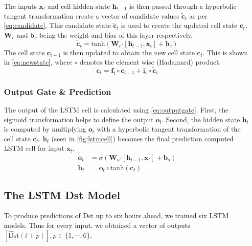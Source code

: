 The inputs $\mathbf{x}_t$ and cell hidden state $\mathbf{h}_{t-1}$ is then passed through a hyperbolic tangent 
transformation create a vector of candidate values $\tilde{\mathbf{c}}_{t}$ as per \cref{eq:candidate}. 
This candidate state $\tilde{\mathbf{c}}_{t}$ is used to create the updated cell state $\mathbf{c}_{t}$. 
$\mathbf{W}_{c}$  and  $\mathbf{b}_{c}$ being the weight and bias of this layer respectively.
%
\begin{equation}\label{eq:candidate}
 \tilde{\mathbf{c}}_{t} = \text{tanh} \left( \mathbf{W}_{c} \boldsymbol{\cdot}  \left[ \mathbf{h}_{t-1},\mathbf{x}_t \right] + 
 \mathbf{b}_{c} \right)
\end{equation}
%
The cell state  $\mathbf{c}_{t-1}$ is then updated to obtain the new cell state $\mathbf{c}_t$. This 
is shown in \cref{eq:newstate}, where $\circ$ denotes the element wise (Hadamard) product. 
%
\begin{equation}\label{eq:newstate}
 \mathbf{c}_t = \mathbf{f}_{t} \circ \mathbf{c}_{t-1} + \mathbf{i}_{t} \circ \tilde{\mathbf{c}}_{t}
\end{equation}

\subsubsection*{Output Gate \& Prediction}

The output of the LSTM cell is calculated using \cref{eq:outputgate}. First, the 
sigmoid transformation helps to define the output $\mathbf{o}_t$. Second, the hidden state $\mathbf{h}_t$ 
is computed by multiplying $\mathbf{o}_{t}$ with a hyperbolic tangent transformation of the cell state 
$\mathbf{c}_{t}$. $\mathbf{h}_{t}$ (seen in \cref{fig:lstmcell}) becomes the final prediction computed 
LSTM cell for input $\mathbf{x}_t$.
%
\begin{align} \label{eq:outputgate}
	\mathbf{o}_{t} &= \sigma \left( 
		\mathbf{W}_o \boldsymbol{\cdot} \left[\mathbf{h}_{t-1}, \mathbf{x}_{t} \right] + \mathbf{b}_o \right) \\
	\mathbf{h}_{t} &= \mathbf{o}_{t} \circ \text{tanh}(\mathbf{c}_t)
\end{align}

\subsection{The LSTM Dst Model}\label{sec:lstmDstArch}

To produce predictions of Dst up to six hours ahead, we trained six LSTM models. Thus for every input, we 
obtained a vector of outputs $[\mathrm{\hat{D}st}\left(t + p\right)], p\in \{ 1, \cdots, 6 \}$.

